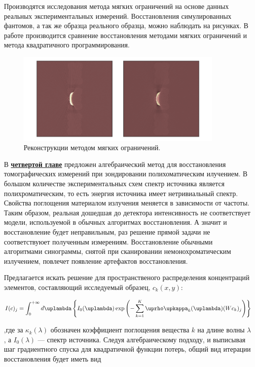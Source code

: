 Производятся исследования метода мягких ограничений на основе данных реальных экспериментальных измерений.
Восстановления симулированных фантомов, а так же образца реального образца, можно наблюдать на рисунках.
В работе производится сравнение восстановления методами мягких ограничений и метода квадратичного программирования.

\begin{figure}
  \centering
  \includegraphics[width=0.9\textwidth]{Dissertation/images/part2_img/sample}
  \caption{Реконструкции методом мягких ограничений.}
  \label{sample}
\end{figure}

В \underline{\textbf{четвертой главе}} предложен алгебраический метод для восстановления томографических измерений при зондировании полихоматическим илучением.
В большом количестве экспериментальных схем спектр источника является полихроматическим, то есть энергия источника имеет нетривиальный спектр.
Свойства поглощения материалом излучения меняется в зависимости от частоты.
Таким образом, реальная дошедшая до детектора интенсивность не соответствует модели, используемой в обычных алгоритмах восстановления.
А значит и восстановление будет неправильным, раз решение прямой задачи не соответствуюет полученным измерениям.
Восстановление обычными алгоритмами синограммы, снятой при сканировании немонохроматическим излучением, повлечет появление артефактов восстановления.

Предлагается искать решение для пространственого распределения концентраций элементов, составляющий исследуемый образец, $c_k(x,y)$:

\begin{equation} \notag
  \label{eq:white_fp_final}
  I(c)_j = \int_0^{+\infty} {d\lambda \left\{
    I_0(\lambda) \exp{\left(
      -\sum_{k=1}^K {\rho \kappa_k(\lambda) (W c_k)_j} 
      \right)}
  \right\}}
\end{equation}

,где за $\kappa_k(\lambda)$ обозначен коэффициент поглощения вещества $k$ на длине волны $\lambda$, а $I_0(\lambda)$ --- спектр источника.
Следуя алгебраическому подходу, и выписывая шаг градиентного спуска для квадратичной функции потерь, общий вид итерации восстановления будет иметь вид

